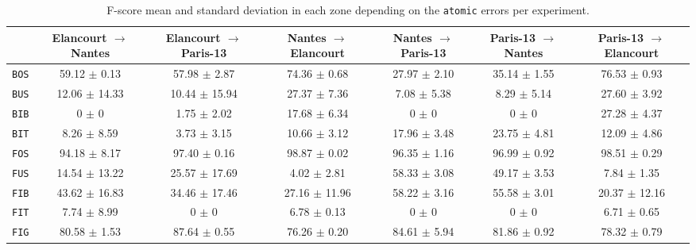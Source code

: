        \begin{sidewaystable}
            \footnotesize
            \begin{tabular}{c c c c c c c }
                \toprule
                & \textbf{Elancourt} $\rightarrow$ \textbf{Nantes} & \textbf{Elancourt} $\rightarrow$ \textbf{Paris-13} & \textbf{Nantes} $\rightarrow$ \textbf{Elancourt} & \textbf{Nantes} $\rightarrow$ \textbf{Paris-13} & \textbf{Paris-13} $\rightarrow$ \textbf{Nantes} & \textbf{Paris-13} $\rightarrow$ \textbf{Elancourt} \\
                \midrule
                \texttt{BOS} & 59.12 $\pm$ 0.13 & 57.98 $\pm$ 2.87 & 74.36 $\pm$ 0.68 & 27.97 $\pm$ 2.10 & 35.14 $\pm$ 1.55 & 76.53 $\pm$ 0.93 \\
                \midrule
                \texttt{BUS} & 12.06 $\pm$ 14.33 & 10.44 $\pm$ 15.94 & 27.37 $\pm$ 7.36 & 7.08 $\pm$ 5.38 & 8.29 $\pm$ 5.14 & 27.60 $\pm$ 3.92 \\
                \midrule
                \texttt{BIB} & 0 $\pm$ 0 & 1.75 $\pm$ 2.02 & 17.68 $\pm$ 6.34 & 0 $\pm$ 0 & 0 $\pm$ 0 & 27.28 $\pm$ 4.37 \\
                \midrule
                \texttt{BIT} & 8.26 $\pm$ 8.59 & 3.73 $\pm$ 3.15 & 10.66 $\pm$ 3.12 & 17.96 $\pm$ 3.48 & 23.75 $\pm$ 4.81 & 12.09 $\pm$ 4.86 \\
                \midrule
                \midrule
                \texttt{FOS} & 94.18 $\pm$ 8.17 & 97.40 $\pm$ 0.16 & 98.87 $\pm$ 0.02 & 96.35 $\pm$ 1.16 & 96.99 $\pm$ 0.92 & 98.51 $\pm$ 0.29 \\
                \midrule
                \texttt{FUS} & 14.54 $\pm$ 13.22 & 25.57 $\pm$ 17.69 & 4.02 $\pm$ 2.81 & 58.33 $\pm$ 3.08 & 49.17 $\pm$ 3.53 & 7.84 $\pm$ 1.35 \\
                \midrule
                \texttt{FIB} & 43.62 $\pm$ 16.83 & 34.46 $\pm$ 17.46 & 27.16 $\pm$ 11.96 & 58.22 $\pm$ 3.16 & 55.58 $\pm$ 3.01 & 20.37 $\pm$ 12.16 \\
                \midrule
                \texttt{FIT} & 7.74 $\pm$ 8.99 & 0 $\pm$ 0 & 6.78 $\pm$ 0.13 & 0 $\pm$ 0 & 0 $\pm$ 0 & 6.71 $\pm$ 0.65 \\
                \midrule
                \texttt{FIG} & 80.58 $\pm$ 1.53 & 87.64 $\pm$ 0.55 & 76.26 $\pm$ 0.20 & 84.61 $\pm$ 5.94 & 81.86 $\pm$ 0.92 & 78.32 $\pm$ 0.79 \\
                \bottomrule
            \end{tabular}
            \caption{
                \label{tab::f_score_1v1_f3}
                F-score mean and standard deviation in each zone depending on the \texttt{atomic} errors per experiment.
            }
        \end{sidewaystable}
        
